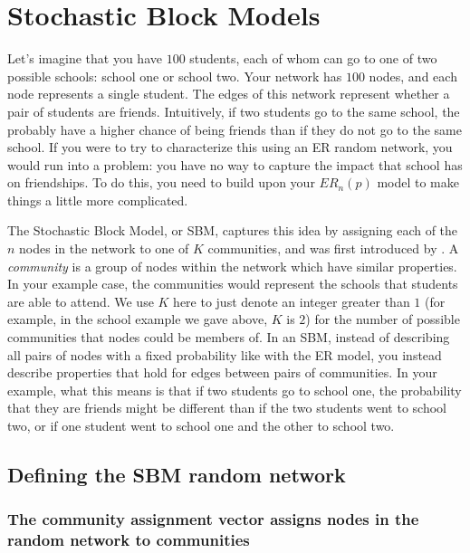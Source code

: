 \section{Stochastic Block Models}
\label{sec:ch5:sbm}

Let's imagine that you have $100$ students, each of whom can go to one of two possible schools: school one or school two. Your network has $100$ nodes, and each node represents a single student. The edges of this network represent whether a pair of students are friends. Intuitively, if two students go to the same school, the probably have a higher chance of being friends than if they do not go to the same school. If you were to try to characterize this using an ER random network, you would run into a problem: you have no way to capture the impact that school has on friendships. To do this, you need to build upon your $ER_n(p)$ model to make things a little more complicated.

The Stochastic Block Model, or SBM, captures this idea by assigning each of the $n$ nodes in the network to one of $K$ communities, and was first introduced by \cite{Holland1983Jun}. A \textit{community} is a group of nodes within the network which have similar properties. In your example case, the communities would represent the schools that students are able to attend. We use $K$ here to just denote an integer greater than $1$ (for example, in the school example we gave above, $K$ is $2$) for the number of {possible} communities that nodes could be members of. In an SBM, instead of describing all pairs of nodes with a fixed probability like with the ER model, you instead describe properties that hold for edges between {pairs of communities}. In your example, what this means is that if two students go to school one, the probability that they are friends might be different than if the two students went to school two, or if one student went to school one and the other to school two.

\subsection{Defining the SBM random network}
\subsubsection{The community assignment vector assigns nodes in the random network to communities}

